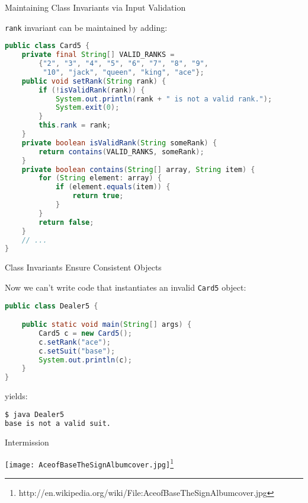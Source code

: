 \documentclass{beamer}
\begin{document}
\begin{frame}[fragile]{Maintaining Class Invariants via Input Validation}


\vspace{-.05in}
{\tt rank} invariant can be maintained by adding:
\vspace{-.05in}
\begin{lstlisting}[language=Java]
public class Card5 {
    private final String[] VALID_RANKS =
        {"2", "3", "4", "5", "6", "7", "8", "9",
         "10", "jack", "queen", "king", "ace"};
    public void setRank(String rank) {
        if (!isValidRank(rank)) {
            System.out.println(rank + " is not a valid rank.");
            System.exit(0);
        }
        this.rank = rank;
    }
    private boolean isValidRank(String someRank) {
        return contains(VALID_RANKS, someRank);
    }
    private boolean contains(String[] array, String item) {
        for (String element: array) {
            if (element.equals(item)) {
                return true;
            }
        }
        return false;
    }
    // ...
}
\end{lstlisting}

\end{frame}

\begin{frame}[fragile]{Class Invariants Ensure Consistent Objects}


Now we can't write code that instantiates an invalid {\tt Card5} object:
\begin{lstlisting}[language=Java]
public class Dealer5 {

    public static void main(String[] args) {
        Card5 c = new Card5();
        c.setRank("ace");
        c.setSuit("base");
        System.out.println(c);
    }
}
\end{lstlisting}
yields:
\begin{lstlisting}[language=bash]
$ java Dealer5
base is not a valid suit.
\end{lstlisting}

\end{frame}

\begin{frame}[fragile]{Intermission}


\begin{center}
\texttt{[image: AceofBaseTheSignAlbumcover.jpg]}\footnote{http://en.wikipedia.org/wiki/File:AceofBaseTheSignAlbumcover.jpg}
\end{center}


\end{frame}
\end{document}
